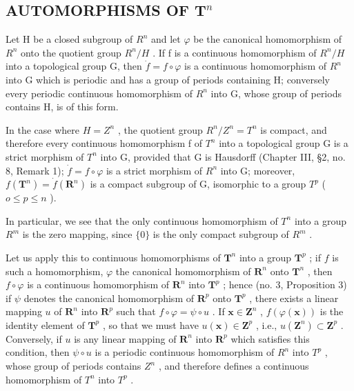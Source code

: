 \subsection{\texorpdfstring{AUTOMORPHISMS OF \(\mathbf{T}^n\)}{AUTOMORPHISMS OF T TO THE N}}

Let H be a closed subgroup of \(R^{n}\) and let \(\varphi\) be the canonical homomorphism of \(R^{n}\) onto the quotient group \(R^{n}/H\) . If f is a continuous homomorphism of \(R^{n}/H\) into a topological group G, then \(\dot{f} = f \circ \varphi\) is a continuous homomorphism of \(R^{n}\) into G which is periodic and has a group of periods containing H; conversely every periodic continuous homomorphism of \(R^{n}\) into G, whose group of periods contains H, is of this form.

In the case where \(H = Z^{n}\) , the quotient group \(R^{n}/Z^{n} = T^{n}\) is compact, and therefore every continuous homomorphism f of \(T^{n}\) into a topological group G is a strict morphism of \(T^{n}\) into G, provided that G is Hausdorff (Chapter III, §2, no. 8, Remark 1); \(\dot{f} = f \circ \varphi\) is a strict morphism of \(R^{n}\) into G; moreover, \(f(\mathbf{T}^{n}) = \dot{f}(\mathbf{R}^{n})\) is a compact subgroup of G, isomorphic to a group \(T^{p}\) ( \(o \leqslant p \leqslant n\) ).

In particular, we see that the only continuous homomorphism of \(T^{n}\) into a group \(R^{m}\) is the zero mapping, since \(\{0\}\) is the only compact subgroup of \(R^{m}\) .

Let us apply this to continuous homomorphisms of \(\mathbf{T}^n\) into a group \(\mathbf{T}^p\) ; if \(f\) is such a homomorphism, \(\varphi\) the canonical homomorphism of \(\mathbf{R}^n\) onto \(\mathbf{T}^n\) , then \(f \circ \varphi\) is a continuous homomorphism of \(\mathbf{R}^n\) into \(\mathbf{T}^p\) ; hence (no. 3, Proposition 3) if \(\psi\) denotes the canonical homomorphism of \(\mathbf{R}^p\) onto \(\mathbf{T}^p\) , there exists a linear mapping \(u\) of \(\mathbf{R}^n\) into \(\mathbf{R}^p\) such that \(f \circ \varphi = \psi \circ u\) . If \(\boldsymbol{x} \in \mathbf{Z}^n\) , \(f(\varphi(\boldsymbol{x}))\) is the identity element of \(\mathbf{T}^p\) , so that we must have \(u(\boldsymbol{x}) \in \mathbf{Z}^p\) , i.e., \(u(\mathbf{Z}^n) \subset \mathbf{Z}^p\) . Conversely, if \(u\) is any linear mapping of \(\mathbf{R}^n\) into \(\mathbf{R}^p\) which satisfies this condition, then \(\psi \circ u\) is a periodic continuous homomorphism of \(R^n\) into \(T^p\) , whose group of periods contains \(Z^n\) , and therefore defines a continuous homomorphism of \(T^n\) into \(T^p\) .

